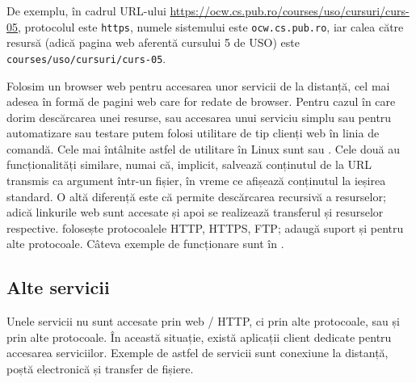 De exemplu, în cadrul URL-ului \url{https://ocw.cs.pub.ro/courses/uso/cursuri/curs-05}, protocolul este \texttt{https}, numele sistemului este \texttt{ocw.cs.pub.ro}, iar calea către resursă (adică pagina web aferentă cursului 5 de USO) este \texttt{courses/uso/cursuri/curs-05}.

Folosim un browser web pentru accesarea unor servicii de la distanță, cel mai adesea în formă de pagini web care for redate de browser.
Pentru cazul în care dorim descărcarea unei resurse, sau accesarea unui serviciu simplu sau pentru automatizare sau testare putem folosi utilitare de tip clienți web în linia de comandă.
Cele mai întâlnite astfel de utilitare în Linux sunt  sau .
Cele două au funcționalități similare, numai că, implicit,  salvează conținutul de la URL transmis ca argument într-un fișier, în vreme ce  afișează conținutul la ieșirea standard.
O altă diferență este că  permite descărcarea recursivă a resurselor; adică linkurile web sunt accesate și apoi se realizează transferul și resurselor respective.
 folosește protocoalele HTTP, HTTPS, FTP;  adaugă suport și pentru alte protocoale.
Câteva exemple de funcționare sunt în .


\subsection{Alte servicii}
\label{sec:net:apps:other}

Unele servicii nu sunt accesate prin web / HTTP, ci prin alte protocoale, sau și prin alte protocoale.
În această situație, există aplicații client dedicate pentru accesarea serviciilor.
Exemple de astfel de servicii sunt conexiune la distanță, poștă electronică și transfer de fișiere.

